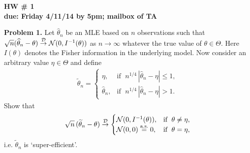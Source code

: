 \documentclass[12pt]{exam}
\begin{document}
\pagestyle{headandfoot} 
%
       {\bf HW \# 1\\ }%
       {\bf due: Friday 4/11/14 by 5pm; mailbox of TA }
\headrule \footrule


\noindent
{\bf Problem 1.} Let $\widehat{\theta}_n$ be an MLE based on $n$ observations such that $\sqrt{n}(\widehat{\theta}_n - \theta) \overset{\cal D}{ \to} {\cal N}(0,I^{-1}(\theta))$ as $n \to \infty$ whatever the true value of $\theta \in \Theta$. Here $I(\theta)$ denotes the Fisher information in the underlying model. Now consider an arbitrary value $\eta \in \Theta$ and define
%
\begin{align*}
\widetilde{\theta}_n = 
%
\begin{cases}
\eta, & \text{if }\; n^{1/4}\,|\widehat{\theta}_n - \eta| \le 1,\\
\widehat{\theta}_n, & \text{if }\;n^{1/4}\,|\widehat{\theta}_n - \eta| > 1.
\end{cases}
\end{align*}
%
Show that 
%
\begin{align*}
\sqrt{n}\,(\widetilde{\theta}_n - \theta) \overset{\cal D}{\to} 
%
\begin{cases} {\cal N}(0,I^{-1}(\theta)),&\text{if }\; \theta \ne \eta, \\
{\cal N}(0,0) \overset{\text{a.s.}} {=} 0,& \text{if }\; \theta = \eta,
\end{cases}
%
\end{align*}
%
i.e. $\widetilde{\theta}_n$ is `super-efficient'.\\

\vspace*{1cm}
\end{document}
